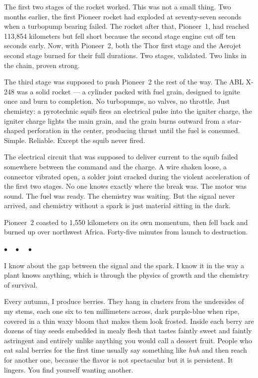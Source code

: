 \documentclass[12pt, letterpaper]{article}
\begin{document}
The first two stages of the rocket worked. This was not a small thing. Two months earlier, the first Pioneer rocket had exploded at seventy-seven seconds when a turbopump bearing failed. The rocket after that, Pioneer~1, had reached 113,854 kilometers but fell short because the second stage engine cut off ten seconds early. Now, with Pioneer~2, both the Thor first stage and the Aerojet second stage burned for their full durations. Two stages, validated. Two links in the chain, proven strong.

The third stage was supposed to push Pioneer~2 the rest of the way. The ABL X-248 was a solid rocket --- a cylinder packed with fuel grain, designed to ignite once and burn to completion. No turbopumps, no valves, no throttle. Just chemistry: a pyrotechnic squib fires an electrical pulse into the igniter charge, the igniter charge lights the main grain, and the grain burns outward from a star-shaped perforation in the center, producing thrust until the fuel is consumed. Simple. Reliable. Except the squib never fired.

The electrical circuit that was supposed to deliver current to the squib failed somewhere between the command and the charge. A wire shaken loose, a connector vibrated open, a solder joint cracked during the violent acceleration of the first two stages. No one knows exactly where the break was. The motor was sound. The fuel was ready. The chemistry was waiting. But the signal never arrived, and chemistry without a spark is just material sitting in the dark.

Pioneer~2 coasted to 1,550 kilometers on its own momentum, then fell back and burned up over northwest Africa. Forty-five minutes from launch to destruction.

\begin{center}
$\bullet\quad\bullet\quad\bullet$
\end{center}

I know about the gap between the signal and the spark. I know it in the way a plant knows anything, which is through the physics of growth and the chemistry of survival.

Every autumn, I produce berries. They hang in clusters from the undersides of my stems, each one six to ten millimeters across, dark purple-blue when ripe, covered in a thin waxy bloom that makes them look frosted. Inside each berry are dozens of tiny seeds embedded in mealy flesh that tastes faintly sweet and faintly astringent and entirely unlike anything you would call a dessert fruit. People who eat salal berries for the first time usually say something like \textit{huh} and then reach for another one, because the flavor is not spectacular but it is persistent. It lingers. You find yourself wanting another.
\end{document}
